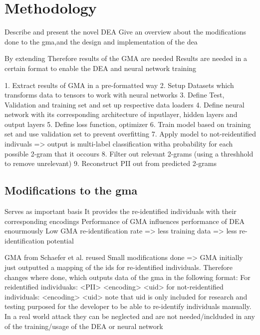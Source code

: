 \chapter{Methodology}  \label{sec:method}
Describe and present the novel DEA
Give an overview about the modifications done to the gma,and the design and implementation of the dea

By extending
Therefore results of the GMA are needed
Results are needed in a certain format to enable the DEA and neural network training


1. Extract results of GMA in a pre-formatted way
2. Setup Datasets which transforms data to tensors to work with neural networks
3. Define Test, Validation and training set and set up respective data loaders
4. Define neural network with its corresponding architecture of inputlayer, hidden layers and output layers
5. Define loss function, optimizer
6. Train model based on training set and use validation set to prevent overfitting
7. Apply model to not-reidentified indivuals => output is multi-label classification witha  probability for each possible 2-gram that it occours
8. Filter out relevant 2-grams (using a threshhold to remove unrelevant)
9. Reconstruct PII out from predicted 2-grams

\section{Modifications to the \ac{gma}} \label{sec:modifications}
Serves as important basis
It provides the re-identified individuals with their corresponding encodings
Performance of GMA influences performance of DEA enourmously
Low GMA re-identification rate => less training data => less re-identification potential


GMA from Schaefer et al. reused
Small modifications done => GMA initially just outputted a mapping of the ids for re-identified individuals. Therefore changes where done, which outputs data of the gma in the following format:
For reidentified individuaks: <PII> <encoding> <uid>
for not-reidentified individuals: <encoding> <uid>
note that uid is only included for research and testing purposed for the developer to be able to re-identify individuals manually. In a real world attack they can be neglected and are not needed/inclduded in any of the training/usage of the DEA or neural network

